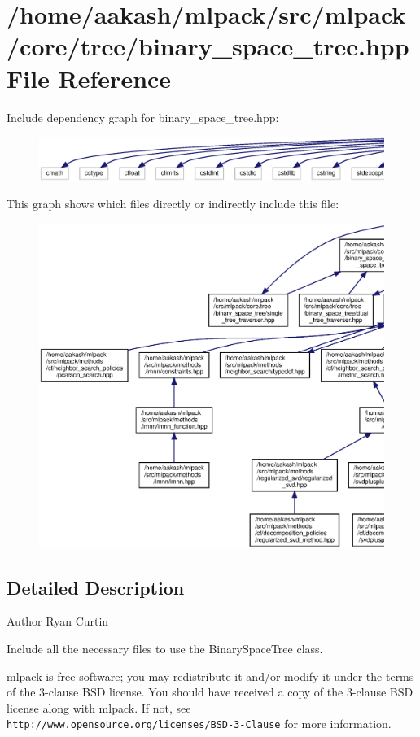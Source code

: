 \section{/home/aakash/mlpack/src/mlpack/core/tree/binary\+\_\+space\+\_\+tree.hpp File Reference}
\label{binary__space__tree_8hpp}
Include dependency graph for binary\+\_\+space\+\_\+tree.\+hpp\+:
\nopagebreak
\begin{figure}[H]
\begin{center}
\leavevmode
\includegraphics[width=350pt]{binary__space__tree_8hpp__incl}
\end{center}
\end{figure}
This graph shows which files directly or indirectly include this file\+:
\nopagebreak
\begin{figure}[H]
\begin{center}
\leavevmode
\includegraphics[width=350pt]{binary__space__tree_8hpp__dep__incl}
\end{center}
\end{figure}


\subsection{Detailed Description}
\begin{DoxyAuthor}{Author}
Ryan Curtin
\end{DoxyAuthor}
Include all the necessary files to use the Binary\+Space\+Tree class.

mlpack is free software; you may redistribute it and/or modify it under the terms of the 3-\/clause B\+SD license. You should have received a copy of the 3-\/clause B\+SD license along with mlpack. If not, see {\tt http\+://www.\+opensource.\+org/licenses/\+B\+S\+D-\/3-\/\+Clause} for more information. 